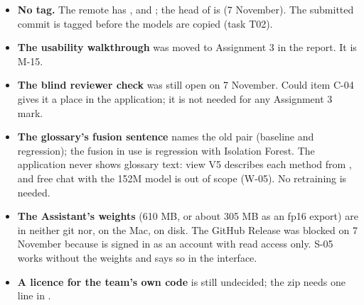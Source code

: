 \begin{itemize}
  \item \textbf{No  tag.} The remote has ,  and
    ; the head of  is  (7 November). The
    submitted commit is tagged before the models are copied (task T02).
  \item \textbf{The usability walkthrough} was moved to Assignment 3 in the report. It is M-15.
  \item \textbf{The blind reviewer check} was still open on 7 November. Could item C-04 gives it a
    place in the application; it is not needed for any Assignment 3 mark.
  \item \textbf{The glossary's fusion sentence} names the old pair (baseline and regression); the
    fusion in use is regression with Isolation Forest. The application never shows glossary text:
    view V5 describes each method from , and free chat with the 152M model is out
    of scope (W-05). No retraining is needed.
  \item \textbf{The Assistant's weights} (610 MB, or about 305 MB as an fp16 export\est{}) are in
    neither git nor, on the Mac, on disk. The GitHub Release was blocked on 7 November because
     is signed in as an account with read access only. S-05 works without the weights and
    says so in the interface.
  \item \textbf{A licence for the team's own code} is still undecided; the zip needs one line in
    .
\end{itemize}
